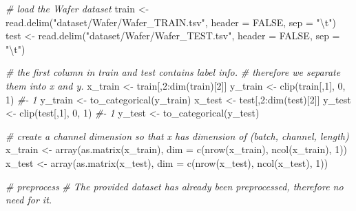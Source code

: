 \documentclass[
]{article}
\newenvironment{Shaded}{\begin{snugshade}}{\end{snugshade}}
\newcommand{\AttributeTok}[1]{\textcolor[rgb]{0.77,0.63,0.00}{#1}}
\newcommand{\CommentTok}[1]{\textcolor[rgb]{0.56,0.35,0.01}{\textit{#1}}}
\newcommand{\ConstantTok}[1]{\textcolor[rgb]{0.00,0.00,0.00}{#1}}
\newcommand{\DecValTok}[1]{\textcolor[rgb]{0.00,0.00,0.81}{#1}}
\newcommand{\FunctionTok}[1]{\textcolor[rgb]{0.00,0.00,0.00}{#1}}
\newcommand{\NormalTok}[1]{#1}
\newcommand{\OtherTok}[1]{\textcolor[rgb]{0.56,0.35,0.01}{#1}}
\newcommand{\SpecialCharTok}[1]{\textcolor[rgb]{0.00,0.00,0.00}{#1}}
\newcommand{\StringTok}[1]{\textcolor[rgb]{0.31,0.60,0.02}{#1}}
\begin{document}
\begin{Shaded}
\begin{Highlighting}[]
\CommentTok{\# load the Wafer dataset}
\NormalTok{train }\OtherTok{\textless{}{-}} \FunctionTok{read.delim}\NormalTok{(}\StringTok{"dataset/Wafer/Wafer\_TRAIN.tsv"}\NormalTok{, }\AttributeTok{header =} \ConstantTok{FALSE}\NormalTok{, }\AttributeTok{sep =} \StringTok{"}\SpecialCharTok{\textbackslash{}t}\StringTok{"}\NormalTok{)}
\NormalTok{test }\OtherTok{\textless{}{-}} \FunctionTok{read.delim}\NormalTok{(}\StringTok{"dataset/Wafer/Wafer\_TEST.tsv"}\NormalTok{, }\AttributeTok{header =} \ConstantTok{FALSE}\NormalTok{, }\AttributeTok{sep =} \StringTok{"}\SpecialCharTok{\textbackslash{}t}\StringTok{"}\NormalTok{)}

\CommentTok{\# the first column in \textasciigrave{}train\textasciigrave{} and \textasciigrave{}test\textasciigrave{} contains label info.}
\CommentTok{\# therefore we separate them into \textasciigrave{}x\textasciigrave{} and \textasciigrave{}y\textasciigrave{}.}
\NormalTok{x\_train }\OtherTok{\textless{}{-}}\NormalTok{ train[,}\DecValTok{2}\SpecialCharTok{:}\FunctionTok{dim}\NormalTok{(train)[}\DecValTok{2}\NormalTok{]]}
\NormalTok{y\_train }\OtherTok{\textless{}{-}} \FunctionTok{clip}\NormalTok{(train[,}\DecValTok{1}\NormalTok{], }\DecValTok{0}\NormalTok{, }\DecValTok{1}\NormalTok{) }\CommentTok{\#{-} 1}
\NormalTok{y\_train }\OtherTok{\textless{}{-}} \FunctionTok{to\_categorical}\NormalTok{(y\_train)}
\NormalTok{x\_test }\OtherTok{\textless{}{-}}\NormalTok{ test[,}\DecValTok{2}\SpecialCharTok{:}\FunctionTok{dim}\NormalTok{(test)[}\DecValTok{2}\NormalTok{]]}
\NormalTok{y\_test }\OtherTok{\textless{}{-}} \FunctionTok{clip}\NormalTok{(test[,}\DecValTok{1}\NormalTok{], }\DecValTok{0}\NormalTok{, }\DecValTok{1}\NormalTok{) }\CommentTok{\#{-} 1}
\NormalTok{y\_test }\OtherTok{\textless{}{-}} \FunctionTok{to\_categorical}\NormalTok{(y\_test)}

\CommentTok{\# create a channel dimension so that \textasciigrave{}x\textasciigrave{} has dimension of (batch, channel, length)}
\NormalTok{x\_train }\OtherTok{\textless{}{-}} \FunctionTok{array}\NormalTok{(}\FunctionTok{as.matrix}\NormalTok{(x\_train), }\AttributeTok{dim =} \FunctionTok{c}\NormalTok{(}\FunctionTok{nrow}\NormalTok{(x\_train), }\FunctionTok{ncol}\NormalTok{(x\_train), }\DecValTok{1}\NormalTok{))}
\NormalTok{x\_test }\OtherTok{\textless{}{-}} \FunctionTok{array}\NormalTok{(}\FunctionTok{as.matrix}\NormalTok{(x\_test), }\AttributeTok{dim =} \FunctionTok{c}\NormalTok{(}\FunctionTok{nrow}\NormalTok{(x\_test), }\FunctionTok{ncol}\NormalTok{(x\_test), }\DecValTok{1}\NormalTok{))}

\CommentTok{\# preprocess}
\CommentTok{\# The provided dataset has already been preprocessed, therefore no need for it.}
\end{Highlighting}
\end{Shaded}
\end{document}
